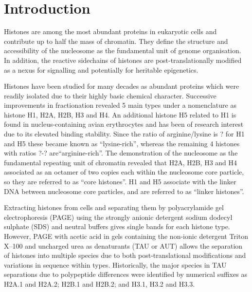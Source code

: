 \documentclass[10pt,a4paper,draft]{article}
\begin{document}
  \section{Introduction}
  \label{sec:intro}

    Histones are among the most abundant proteins in eukaryotic cells and contribute up to half
    the mass of chromatin. They define the structure and accessibility of the nucleosome as the
    fundamental unit of genome organisation. In addition, the reactive sidechains of histones
    are post-translationally modified as a nexus for signalling and potentially for heritable
    epigenetics.

    Histones have been studied for many decades as abundant proteins which were readily isolated
    due to their highly basic chemical character. Successive improvements in fractionation revealed
    5 main types under a nomenclature as histone H1, H2A, H2B, H3 and H4. An additional histone H5
    related to H1 is found in nucleus-containing avian erythrocytes and has been of research interest
    due to its elevated binding stability. Since the ratio of arginine/lysine is ? for H1 and H5 these
    became known as ``lysine-rich'', whereas the remaining 4 histones with ratios ?-? are``arginine-rich''.
    The demonstration of the nucleosome as the fundamental repeating unit of chromatin revealed that H2A,
    H2B, H3 and H4 associated as an octamer of two copies each within the nucleosome core particle,
    so they are referred to as ``core histones''. H1 and H5 associate with the linker DNA between
    nucleosome core particles, and are referred to as ``linker histones''.

    Extracting histones from cells and separating them by polyacrylamide gel electrophoresis (PAGE) using
    the strongly anionic detergent sodium dodecyl sulphate (SDS) and neutral buffers gives single bands
    for each histone type. However, PAGE with acetic acid in gels containing the non-ionic detergent
    Triton X--100 and uncharged urea as denaturants (TAU or AUT) allows the separation of histones
    into multiple species due to both post-translational modifications and variations in sequence
    within types. Historically, the major species in TAU separations due to polypeptide differences
    were identified by numerical suffixes as H2A.1 and H2A.2; H2B.1 and H2B.2; and H3.1, H3.2 and H3.3.
\end{document}
